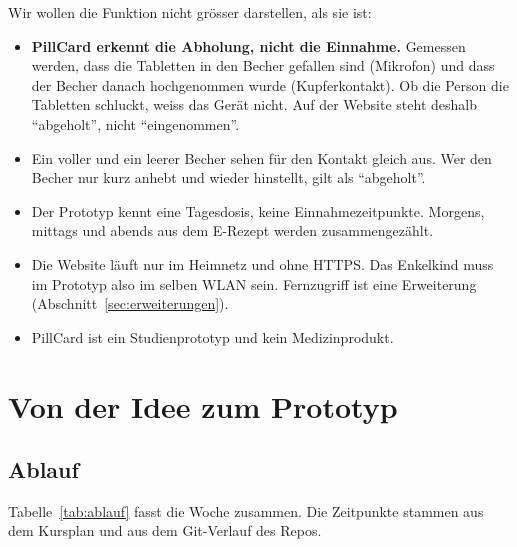 \documentclass[11pt,a4paper]{article}
\begin{document}
Wir wollen die Funktion nicht grösser darstellen, als sie ist:
\begin{itemize}
\item \textbf{PillCard erkennt die Abholung, nicht die Einnahme.} Gemessen werden, dass die Tabletten in
  den Becher gefallen sind (Mikrofon) und dass der Becher danach hochgenommen wurde (Kupferkontakt). Ob die
  Person die Tabletten schluckt, weiss das Gerät nicht. Auf der Website steht deshalb \enquote{abgeholt},
  nicht \enquote{eingenommen}.
\item Ein voller und ein leerer Becher sehen für den Kontakt gleich aus. Wer den Becher nur kurz anhebt und
  wieder hinstellt, gilt als \enquote{abgeholt}.
\item Der Prototyp kennt eine Tagesdosis, keine Einnahmezeitpunkte. Morgens, mittags und abends aus dem
  E-Rezept werden zusammengezählt.
\item Die Website läuft nur im Heimnetz und ohne HTTPS. Das Enkelkind muss im Prototyp also im selben WLAN
  sein. Fernzugriff ist eine Erweiterung (Abschnitt~\ref{sec:erweiterungen}).
\item PillCard ist ein Studienprototyp und kein Medizinprodukt.
\end{itemize}

\section{Von der Idee zum Prototyp}
\label{sec:weg}

\subsection{Ablauf}

Tabelle~\ref{tab:ablauf} fasst die Woche zusammen. Die Zeitpunkte stammen aus dem Kursplan und aus dem
Git-Verlauf des Repos.
\end{document}

